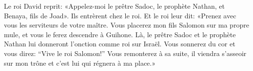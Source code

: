 Le roi David reprit:
	«Appelez-moi le prêtre Sadoc, le prophète Nathan, et Benaya, fils de Joad».
Ils entrèrent chez le roi.
Et le roi leur dit: «Prenez avec vous les serviteurs de votre maître.
	Vous placerez mon fils Salomon sur ma propre mule,
	et vous le ferez descendre à Guihone.
Là, le prêtre Sadoc et le prophète Nathan lui donneront l’onction comme roi sur Israël.
	Vous sonnerez du cor et vous direz: “Vive le roi Salomon!”
Vous remonterez à sa suite,
	il viendra s’asseoir sur mon trône et c’est lui qui régnera à ma place.»
